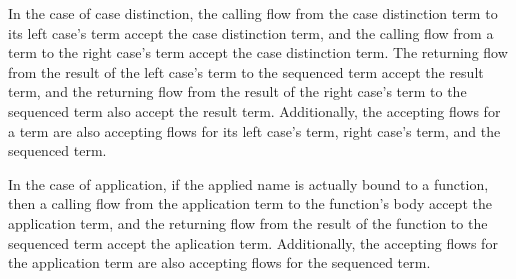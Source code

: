 \documentclass[letterpaper, 11pt]{report}
\begin{document}
In the case of case distinction, the calling flow from the case distinction term to
its left case's term accept the case distinction term, and
the calling flow from a term to
the right case's term accept the case distinction term.
The returning flow from the result of the
left case's term to the sequenced term accept the result term,
and the returning flow from the result of the right case's term to the sequenced term
also accept the result term. Additionally, the accepting flows for a term are also
accepting flows for its left case's term, right case's term,
and the sequenced term.  

In the case of application, if the applied name is actually bound to a function,
then a calling flow from the application term to the function's body 
accept the application term, and the returning flow from the result of the function
 to the sequenced term accept the aplication term.
Additionally, the accepting flows for the application term are also
accepting flows for the sequenced term. 
\end{document}
